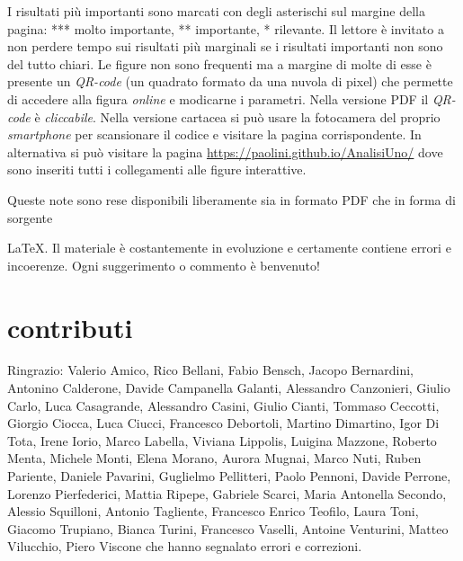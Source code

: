 I risultati più importanti sono marcati con degli asterischi sul margine %
della pagina: *** molto importante, ** importante, * rilevante. %
Il lettore è invitato a non perdere tempo sui risultati più marginali %
se i risultati importanti non sono del tutto chiari. %
Le figure non sono frequenti ma a margine di molte di esse  %
è presente un \emph{QR-code} (un quadrato formato da una nuvola di pixel) %
che permette di accedere alla figura  %
\emph{online} e modicarne i parametri.  %
Nella versione PDF il \emph{QR-code} è \emph{cliccabile}.  %
Nella versione cartacea si può usare la fotocamera del proprio %
\emph{smartphone} per scansionare il codice e visitare la pagina corrispondente. %
In alternativa si può visitare la pagina \url{https://paolini.github.io/AnalisiUno/}
dove sono inseriti tutti i collegamenti alle figure interattive.
\begin{comment}
Di seguito in questa pagina trovate l'elenco %
con i collegamenti alle figure interattive. %
\end{comment}
Queste note sono rese disponibili liberamente sia in formato PDF che %
in forma di sorgente %
\begin{comment}
LaTeX. %
\end{comment}
\LaTeX{}.
Il materiale è costantemente in evoluzione %
e certamente contiene errori e incoerenze. Ogni suggerimento o commento è %
benvenuto! %


\section*{contributi}

Ringrazio:
%
Valerio Amico,
Rico Bellani,
Fabio Bensch,
Jacopo Bernardini,
Antonino Calderone,
Davide Campanella Galanti,
Alessandro Canzonieri,
Giulio Carlo,
Luca Casagrande,
Alessandro Casini,
Giulio Cianti,
Tommaso Ceccotti,
Giorgio Ciocca,
Luca Ciucci,
Francesco Debortoli,
Martino Dimartino,
Igor Di Tota,
Irene Iorio,
Marco Labella,
Viviana Lippolis,
Luigina Mazzone,
Roberto Menta,
Michele Monti,
Elena Morano,
Aurora Mugnai,
Marco Nuti,
Ruben Pariente,
Daniele Pavarini,
Guglielmo Pellitteri,
Paolo Pennoni,
Davide Perrone,
Lorenzo Pierfederici,
Mattia Ripepe,
Gabriele Scarci,
Maria Antonella Secondo,
Alessio Squilloni,
Antonio Tagliente,
Francesco Enrico Teofilo,
Laura Toni,
Giacomo Trupiano,
Bianca Turini,
Francesco Vaselli,
Antoine Venturini,
Matteo Vilucchio,
Piero Viscone
%
che hanno segnalato errori e correzioni.

